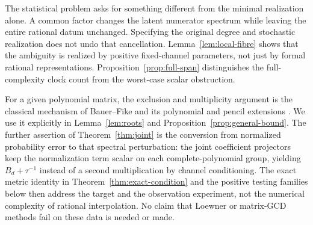 The statistical problem asks for something different from the minimal
realization alone. A common factor changes the latent numerator
spectrum while leaving the entire rational datum unchanged. Specifying
the original degree and stochastic realization does not undo that
cancellation. Lemma~\ref{lem:local-fibre} shows that the ambiguity is
realized by positive fixed-channel parameters, not just by formal
rational representations. Proposition~\ref{prop:full-span} distinguishes
the full-complexity clock count from the worst-case scalar obstruction.

For a given polynomial matrix, the exclusion and multiplicity argument
is the classical mechanism of Bauer--Fike and its polynomial and
pencil extensions \cite{BF,Chu87,Chu03,TH,HMT,SB}. We use it explicitly
in Lemma~\ref{lem:roots} and Proposition~\ref{prop:general-bound}.
The further assertion of Theorem~\ref{thm:joint} is the conversion
from normalized probability error to that spectral perturbation: the
joint coefficient projectors keep the normalization term scalar on
each complete-polynomial group, yielding $B_d+\tau^{-1}$ instead of
a second multiplication by channel conditioning. The exact metric
identity in Theorem~\ref{thm:exact-condition} and the positive testing
families below then address the target and the observation experiment,
not the numerical complexity of rational interpolation. No claim that
Loewner or matrix-GCD methods fail on these data is needed or made.
